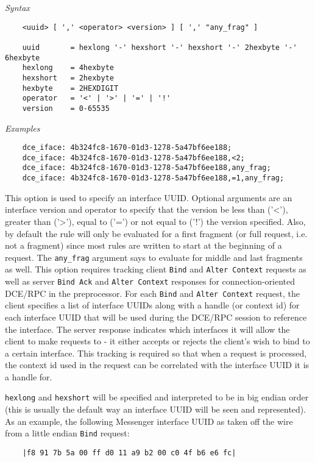 \documentclass[english]{report}
\begin{document}
\begin{itemize}
\textit{Syntax}
\footnotesize
\begin{verbatim}
    <uuid> [ ',' <operator> <version> ] [ ',' "any_frag" ]

    uuid       = hexlong '-' hexshort '-' hexshort '-' 2hexbyte '-' 6hexbyte
    hexlong    = 4hexbyte
    hexshort   = 2hexbyte
    hexbyte    = 2HEXDIGIT
    operator   = '<' | '>' | '=' | '!'
    version    = 0-65535
\end{verbatim}
\normalsize
\textit{Examples}
\footnotesize
\begin{verbatim}
    dce_iface: 4b324fc8-1670-01d3-1278-5a47bf6ee188;
    dce_iface: 4b324fc8-1670-01d3-1278-5a47bf6ee188,<2;
    dce_iface: 4b324fc8-1670-01d3-1278-5a47bf6ee188,any_frag;
    dce_iface: 4b324fc8-1670-01d3-1278-5a47bf6ee188,=1,any_frag;
\end{verbatim}
\normalsize

This option is used to specify an interface UUID. Optional arguments are an
interface version and operator to specify that the version be less than
('\textless'), greater than ('\textgreater'), equal to ('=') or not equal to
('!') the version specified.  Also, by default the rule will only be evaluated
for a first fragment (or full request, i.e. not a fragment) since most rules
are written to start at the beginning of a request. The \texttt{any\_frag}
argument says to evaluate for middle and last fragments as well.  This option
requires tracking client \texttt{Bind} and \texttt{Alter Context} requests as
well as server \texttt{Bind Ack} and \texttt{Alter Context} responses for
connection-oriented DCE/RPC in the preprocessor. For each \texttt{Bind} and
\texttt{Alter Context} request, the client specifies a list of interface UUIDs
along with a handle (or context id) for each interface UUID that will be used
during the DCE/RPC session to reference the interface.  The server response
indicates which interfaces it will allow the client to make requests to - it
either accepts or rejects the client's wish to bind to a certain interface.
This tracking is required so that when a request is processed, the context id
used in the request can be correlated with the interface UUID it is a handle
for.

\texttt{hexlong} and \texttt{hexshort} will be specified and interpreted to be
in big endian order (this is usually the default way an interface UUID will be
seen and represented). As an example, the following Messenger interface UUID as
taken off the wire from a little endian \texttt{Bind} request:

\begin{verbatim}
    |f8 91 7b 5a 00 ff d0 11 a9 b2 00 c0 4f b6 e6 fc|
\end{verbatim}


\end{itemize}
\end{document}

